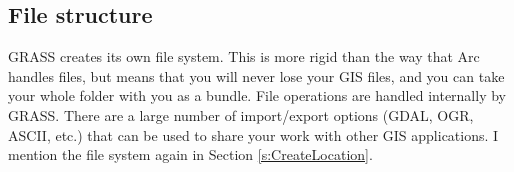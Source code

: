 \documentclass{book}
\begin{document}
\subsection{File structure}

GRASS creates its own file system. This is more rigid than the way that Arc handles files, but means that you will never lose your GIS files, and you can take your whole folder with you as a bundle. File operations are handled internally by GRASS. There are a large number of import/export options (GDAL, OGR, ASCII, etc.) that can be used to share your work with other GIS applications. I mention the file system again in Section \ref{s:CreateLocation}.

\end{document}
